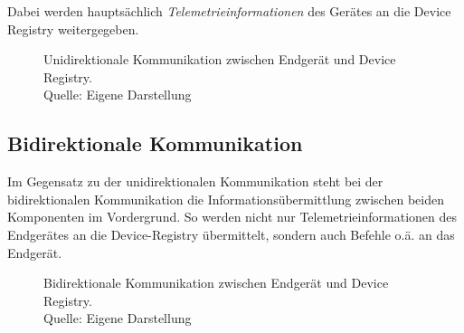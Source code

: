 Dabei werden hauptsächlich \textit{Telemetrieinformationen} des Gerätes an die Device Registry weitergegeben. 

\begin{figure}[h]
    \centering
    \caption[Unidirektionale Kommunikation]{Unidirektionale Kommunikation zwischen Endgerät und Device Registry.\\Quelle: Eigene Darstellung}
\end{figure}

\subsection*{Bidirektionale Kommunikation}
Im Gegensatz zu der unidirektionalen Kommunikation steht bei der bidirektionalen Kommunikation die Informationsübermittlung zwischen beiden Komponenten im Vordergrund. So werden nicht nur Telemetrieinformationen des Endgerätes an die Device-Registry übermittelt, sondern auch Befehle o.ä. an das Endgerät.

\begin{figure}[h]
    \centering
    \caption[Bidirektionale Kommunikation]{Bidirektionale Kommunikation zwischen Endgerät und Device Registry.\\Quelle: Eigene Darstellung}
\end{figure}

